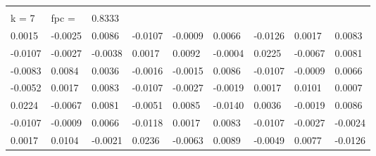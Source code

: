 \documentclass[letterpaper, 12pt]{article}
\begin{document}
\begin{table}[h]
\begin{tabular}{lllllllll}
        &         &         &         &         &         &         &         &         \\
k = 7   & fpc =   & 0.8333  &         &         &         &         &         &         \\
0.0015  & -0.0025 & 0.0086  & -0.0107 & -0.0009 & 0.0066  & -0.0126 & 0.0017  & 0.0083  \\
-0.0107 & -0.0027 & -0.0038 & 0.0017  & 0.0092  & -0.0004 & 0.0225  & -0.0067 & 0.0081  \\
-0.0083 & 0.0084  & 0.0036  & -0.0016 & -0.0015 & 0.0086  & -0.0107 & -0.0009 & 0.0066  \\
-0.0052 & 0.0017  & 0.0083  & -0.0107 & -0.0027 & -0.0019 & 0.0017  & 0.0101  & 0.0007  \\
0.0224  & -0.0067 & 0.0081  & -0.0051 & 0.0085  & -0.0140 & 0.0036  & -0.0019 & 0.0086  \\
-0.0107 & -0.0009 & 0.0066  & -0.0118 & 0.0017  & 0.0083  & -0.0107 & -0.0027 & -0.0024 \\
0.0017  & 0.0104  & -0.0021 & 0.0236  & -0.0063 & 0.0089  & -0.0049 & 0.0077  & -0.0126 \\
\end{tabular}
\end{table}
\end{document}
